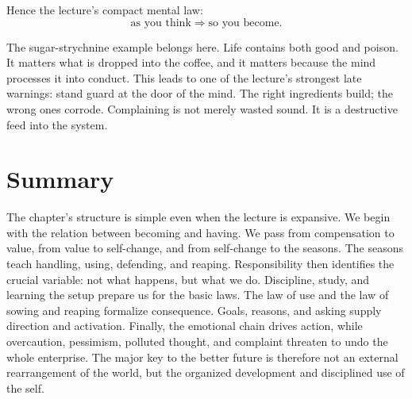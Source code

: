 Hence the lecture's compact mental law:
\begin{equation}
\text{as you think} \Rightarrow \text{so you become}.
\end{equation}

The sugar-strychnine example belongs here. Life contains both good and poison. It matters what is dropped into the coffee, and it matters because the mind processes it into conduct. This leads to one of the lecture's strongest late warnings: stand guard at the door of the mind. The right ingredients build; the wrong ones corrode. Complaining is not merely wasted sound. It is a destructive feed into the system.

\section{Summary}

The chapter's structure is simple even when the lecture is expansive. We begin with the relation between becoming and having. We pass from compensation to value, from value to self-change, and from self-change to the seasons. The seasons teach handling, using, defending, and reaping. Responsibility then identifies the crucial variable: not what happens, but what we do. Discipline, study, and learning the setup prepare us for the basic laws. The law of use and the law of sowing and reaping formalize consequence. Goals, reasons, and asking supply direction and activation. Finally, the emotional chain drives action, while overcaution, pessimism, polluted thought, and complaint threaten to undo the whole enterprise. The major key to the better future is therefore not an external rearrangement of the world, but the organized development and disciplined use of the self.